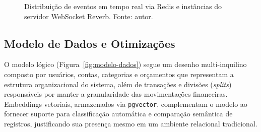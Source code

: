 \begin{figure}[htbp]
    \centering
    \caption{Distribuição de eventos em tempo real via Redis e instâncias do servidor WebSocket Reverb. Fonte: autor.}
    \label{fig:reverb-redis}
\end{figure}

\FloatBarrier
\subsection{Modelo de Dados e Otimizações}

O modelo lógico (Figura~\ref{fig:modelo-dados}) segue um desenho multi-inquilino
composto por usuários, contas, categorias e orçamentos que representam a estrutura
organizacional do sistema, além de transações e divisões (\textit{splits}) responsáveis
por manter a granularidade das movimentações financeiras. Embeddings vetoriais, armazenados
via \texttt{pgvector}, complementam o modelo ao fornecer suporte para classificação
automática e comparação semântica de registros, justificando sua presença mesmo em
um ambiente relacional tradicional.

